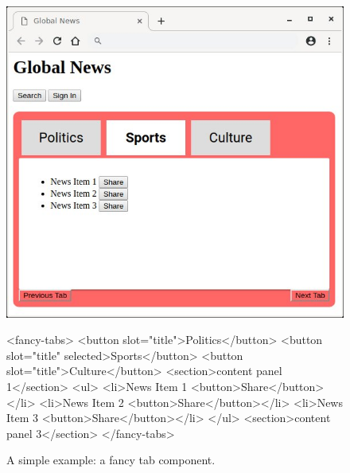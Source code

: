\documentclass[10pt,DIV16,a4paper,abstract=true,twoside=semi,openright]
{scrreprt}
\begin{document}
\begin{figure}[b]
  \begin{lrbox}{\fstlst}%
    \begin{minipage}{.34\linewidth}
      \centering
      \includegraphics[width=\linewidth]{fancytabs-normal}
    \end{minipage}
  \end{lrbox}
  \begin{lrbox}{\sndlst}%
    \begin{minipage}{.63\linewidth}
      \begin{html}[basicstyle=\ttfamily\scriptsize]
<fancy-tabs>
  <button slot="title">Politics</button>
  <button slot="title" selected>Sports</button>
  <button slot="title">Culture</button>
  <section>content panel 1</section>
  <ul>
    <li>News Item 1 <button>Share</button></li>
    <li>News Item 2 <button>Share</button></li>
    <li>News Item 3 <button>Share</button></li>
  </ul>
  <section>content panel 3</section>
</fancy-tabs>
      \end{html}
    \end{minipage}
  \end{lrbox}
  \hfill%
  \caption{A simple example: a fancy tab component.}\label{fig:running-example}
\end{figure}
\end{document}
